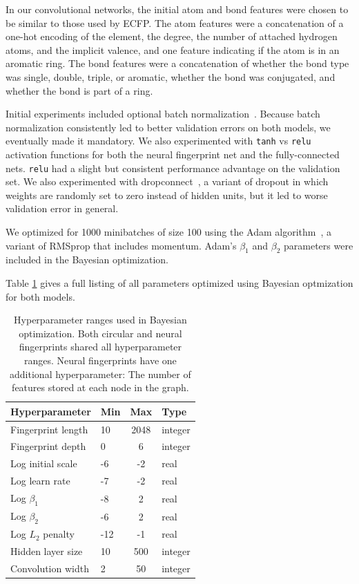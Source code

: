 \documentclass{article}
\begin{document}
In our convolutional networks, the initial atom and bond features were chosen to be similar to those used by ECFP.
The atom features were a concatenation of a one-hot encoding of the element, the degree, the number of attached hydrogen atoms, and the implicit valence, and one feature indicating if the atom is in an aromatic ring. 
The bond features were a concatenation of whether the bond type was single, double, triple, or aromatic, whether the bond was conjugated, and whether the bond is part of a ring.

Initial experiments included optional batch normalization~\citep{ioffe2015batch}.
Because batch normalization consistently led to better validation errors on both models, we eventually made it mandatory.
We also experimented with \texttt{tanh} vs \texttt{relu} activation functions for both the neural fingerprint net and the fully-connected nets.  \texttt{relu} had a slight but consistent performance advantage on the validation set.
We also experimented with dropconnect~\citep{wan2013regularization}, a variant of dropout in which weights are randomly set to zero instead of hidden units, but it led to worse validation error in general.

We optimized for 1000 minibatches of size 100 using the Adam algorithm~\citep{Adam14}, a variant of RMSprop that includes momentum.
Adam's $\beta_1$ and $\beta_2$ parameters were included in the Bayesian optimization.

Table \ref{table:bayesopt params} gives a full listing of all parameters optimized using Bayesian optmization for both models.

\begin{table}
\center
\begin{tabular}{l|lcl}
Hyperparameter & Min & Max & Type \\
\hline
Fingerprint length & 10  & 2048 & integer \\
Fingerprint depth  & 0   & 6    & integer \\
Log initial scale  & -6  & -2   & real \\
Log learn rate     & -7  & -2   & real \\
Log $\beta_1$      & -8  & 2    & real \\
Log $\beta_2$      & -6  & 2    & real \\
Log $L_2$ penalty  & -12 & -1   & real \\
Hidden layer size  & 10  & 500  & integer \\
\hline 
Convolution width  & 2   & 50   & integer
\end{tabular}
\caption{Hyperparameter ranges used in Bayesian optimization.
Both circular and neural fingerprints shared all hyperparameter ranges.
Neural fingerprints have one additional hyperparameter: The number of features stored at each node in the graph.}
\label{table:bayesopt params}
\end{table}
\end{document}
